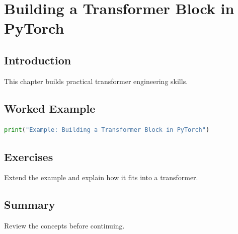 \chapter{Building a Transformer Block in PyTorch}
\label{chap:vol8-20}



\section{Introduction}
This chapter builds practical transformer engineering skills.

\section{Worked Example}
\begin{lstlisting}[language=Python]
print("Example: Building a Transformer Block in PyTorch")
\end{lstlisting}

\section{Exercises}
\begin{exercise}
Extend the example and explain how it fits into a transformer.
\end{exercise}

\section{Summary}
Review the concepts before continuing.
